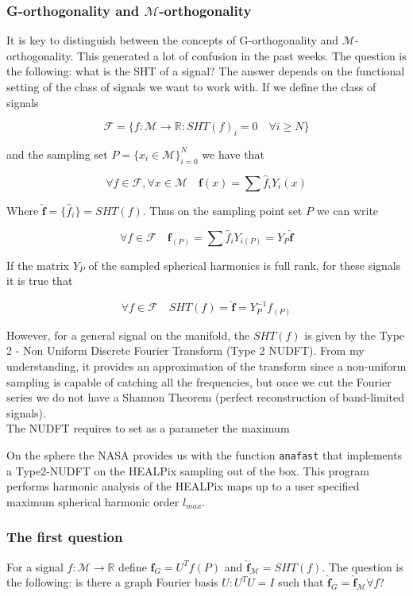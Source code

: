 \subsubsection*{G-orthogonality and $\mathcal M$-orthogonality}
It is key to distinguish between the concepts of G-orthogonality and $\mathcal M$-orthogonality. This generated a lot of confusion in the past weeks. The question is the following: what is the SHT of a signal? The answer depends on the functional setting of the class of signals we want to work with. If we define the class of signals 

$$\mathcal F = \{f: \mathcal M \rightarrow \mathbb R: SHT(f)_i = 0\quad \forall i \geq N \}$$ 

and the sampling set $P = \{x_i \in \mathcal M\}_{i=0}^N$ we have that 

$$\forall f\in \mathcal F,  \forall x\in \mathcal M \quad \mathbf f(x)=\sum \hat f_i Y_i(x)$$

Where $\mathbf {\hat f} = \{\hat f_i\} = SHT(f)$. Thus on the sampling point set $P$ we can write

$$\forall f\in \mathcal F\quad \mathbf f_{(P)}=\sum \hat f_i Y_{i(P)} = Y_P \mathbf {\hat  f}$$


If the matrix $Y_P$ of the sampled spherical harmonics is full rank, for these signals it is true that

$$\forall f \in \mathcal F \quad SHT(f) = \mathbf{\hat f} = Y_P^{-1} f_{(P)}$$

However, for a general signal on the manifold, the $SHT(f)$ is given by the Type 2 - Non Uniform Discrete Fourier Transform (Type 2 NUDFT). From my understanding, it provides an approximation of the transform since a non-uniform sampling is capable of catching all the frequencies, but once we cut the Fourier series we do not have a Shannon Theorem (perfect reconstruction of band-limited signals).\\
The NUDFT requires to set as a parameter the maximum 

On the sphere the NASA provides us with the function \lstinline {anafast} that implements a Type2-NUDFT on the HEALPix sampling out of the box. This program performs harmonic analysis of the HEALPix maps up to a user specified maximum spherical harmonic order $l_{max}$.

\subsubsection*{The first question}
For a signal $f: \mathcal M \rightarrow \mathbb R$ define $\mathbf{\hat f}_G = U^T f(P)$ and  $\mathbf{\hat f}_\mathcal M = SHT(f)$.
The question is the following: is there a graph Fourier basis $U: U^TU=I$ such that $\mathbf{\hat f}_G = \mathbf{\hat f}_\mathcal M \forall f$?

